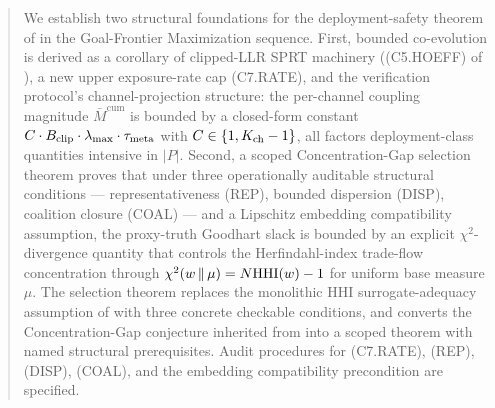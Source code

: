 \begin{abstract}
We establish two structural foundations for the deployment-safety
theorem of \citep[Deployment Safety]{lasser2026paper10} in the
Goal-Frontier Maximization sequence. First, bounded co-evolution
is derived as a corollary of clipped-LLR SPRT machinery
((C5.HOEFF) of \citep[Deployment Safety]{lasser2026paper10}), a
new upper exposure-rate cap (C7.RATE), and the verification
protocol's channel-projection structure: the per-channel coupling
magnitude $\bar{M}^{\mathrm{cum}}$ is bounded by a closed-form
constant $C \cdot \Bclip \cdot \lammax \cdot \taumeta$ with
$C \in \{1, \Kch - 1\}$, all factors deployment-class quantities
intensive in $|P|$. Second, a scoped Concentration-Gap selection
theorem proves that under three operationally auditable structural
conditions --- representativeness (REP), bounded dispersion (DISP),
coalition closure (COAL) --- and a Lipschitz embedding
compatibility assumption, the proxy-truth Goodhart slack is
bounded by an explicit $\chi^2$-divergence quantity that controls
the Herfindahl-index trade-flow concentration through
$\chi^2(w \,\|\, \mu) = N \HHI(w) - 1$ for uniform base measure
$\mu$. The selection theorem replaces the monolithic HHI
surrogate-adequacy assumption of
\citep[Deployment Safety]{lasser2026paper10} with three concrete
checkable conditions, and converts the Concentration-Gap
conjecture inherited from
\citep[Microfoundation]{lasser2026micro} into a scoped theorem
with named structural prerequisites. Audit procedures for
(C7.RATE), (REP), (DISP), (COAL), and the embedding compatibility
precondition are specified.
\end{abstract}
